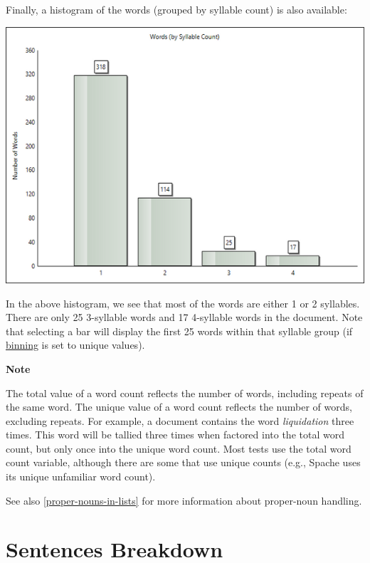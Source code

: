 \documentclass[
]{book}
\newenvironment{notesection}
    {
    \begin{tcolorbox}[colframe=mediumblue,colback=lightblue,coltext=mediumblue,arc=3mm]
    \faLightbulb[regular] \textbf{Note} \newline
    }
    {
    \end{tcolorbox}
    }
\theoremstyle{definition}
\theoremstyle{definition}
\theoremstyle{definition}
\theoremstyle{definition}
\theoremstyle{remark}
\begin{document}
Finally, a histogram of the words (grouped by syllable count) is also available:

\includegraphics{Images/SyllableCountHistogram.png}

In the above histogram, we see that most of the words are either 1 or 2 syllables. There are only 25 3-syllable words and 17 4-syllable words in the document. Note that selecting a bar will display the first 25 words within that syllable group (if \protect\hyperlink{options-histograms}{binning} is set to unique values).

\begin{notesection}
The total value of a word count reflects the number of words, including repeats of the same word. The unique value of a word count reflects the number of words, excluding repeats. For example, a document contains the word \emph{liquidation} three times. This word will be tallied three times when factored into the total word count, but only once into the unique word count. Most tests use the total word count variable, although there are some that use unique counts (e.g., Spache uses its unique unfamiliar word count).

\end{notesection}

See also \ref{proper-nouns-in-lists} for more information about proper-noun handling.

\hypertarget{reviewing-sentences-breakdown}{%
\section{Sentences Breakdown}\label{reviewing-sentences-breakdown}}
\end{document}
